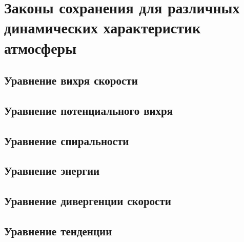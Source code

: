 \chapter{Законы сохранения для различных динамических характеристик атмосферы}
    \lipsum[1-2]

\section{Уравнение вихря скорости}
    \lipsum[1-2]

\section{Уравнение потенциального вихря}
    \lipsum[1-2]

\section{Уравнение спиральности}
    \lipsum[1-2]

\section{Уравнение энергии}
    \lipsum[1-2]

\section{Уравнение дивергенции скорости}
    \lipsum[1-2]

\section{Уравнение тенденции}
    \lipsum[1-2]

